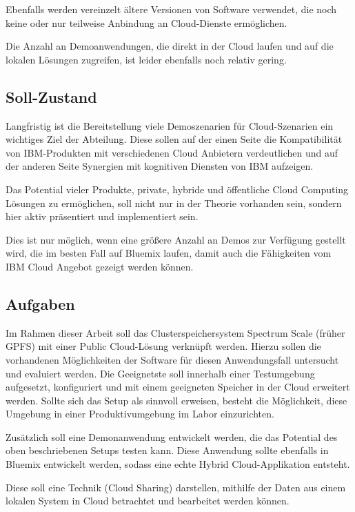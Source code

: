Ebenfalls werden vereinzelt ältere Versionen von Software verwendet, die noch keine oder nur teilweise Anbindung an Cloud-Dienste ermöglichen. 

Die Anzahl an Demoanwendungen, die direkt in der Cloud laufen und auf die lokalen Lösungen zugreifen, ist leider ebenfalls noch relativ gering. 

\subsection{Soll-Zustand}

Langfristig ist die Bereitstellung viele Demoszenarien für Cloud-Szenarien ein wichtiges Ziel der Abteilung. Diese sollen auf der einen Seite die Kompatibilität von IBM-Produkten mit verschiedenen Cloud Anbietern verdeutlichen und auf der anderen Seite Synergien mit kognitiven Diensten von IBM aufzeigen.

Das Potential vieler Produkte, private, hybride und öffentliche Cloud Computing Lösungen zu ermöglichen, soll nicht nur in der Theorie vorhanden sein, sondern hier aktiv präsentiert und implementiert sein.

Dies ist nur möglich, wenn eine größere Anzahl an Demos zur Verfügung gestellt wird, die im besten Fall auf \gls{Bluemix} laufen, damit auch die Fähigkeiten vom IBM Cloud Angebot gezeigt werden können. 

\subsection{Aufgaben}

Im Rahmen dieser Arbeit soll das Clusterspeichersystem Spectrum Scale (früher GPFS) mit einer Public Cloud-Lösung verknüpft werden. Hierzu sollen die vorhandenen Möglichkeiten der Software für diesen Anwendungsfall untersucht und evaluiert werden.
Die Geeignetste soll innerhalb einer Testumgebung aufgesetzt, konfiguriert und mit einem geeigneten Speicher in der Cloud erweitert werden. 
Sollte sich das Setup als sinnvoll erweisen, besteht die Möglichkeit, diese Umgebung in einer Produktivumgebung im Labor einzurichten.

Zusätzlich soll eine Demonanwendung entwickelt werden, die das Potential des oben beschriebenen Setups testen kann. Diese Anwendung sollte ebenfalls in \gls{Bluemix} entwickelt werden, sodass eine echte Hybrid Cloud-Applikation entsteht. 

Diese soll eine Technik (Cloud Sharing) darstellen, mithilfe der Daten aus einem lokalen System in Cloud betrachtet und bearbeitet werden können.

